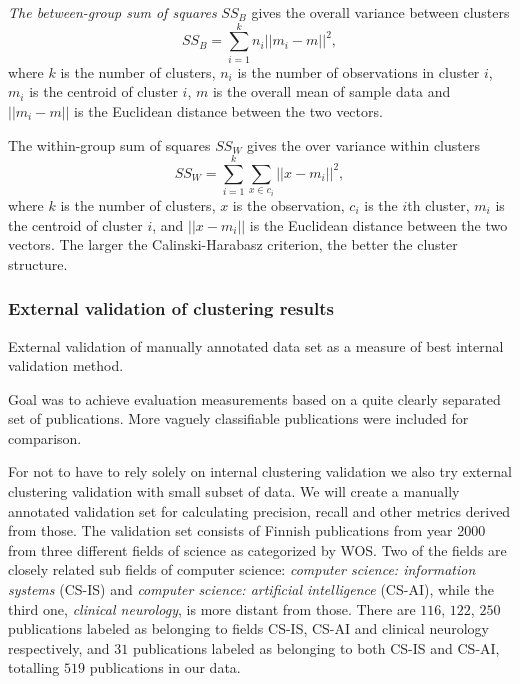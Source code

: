\emph{The between-group sum of squares} $SS_B$ gives the overall variance
between clusters
\begin{equation}
 SS_B = \sum_{i=1}^k n_i ||m_i-m||^2,
\end{equation}
where $k$ is the number of clusters, $n_i$ is the number of 
observations in cluster $i$, $m_i$ is the centroid of cluster $i$, 
$m$ is the overall mean of sample data and $||m_i-m||$ is the 
Euclidean distance between the two vectors.

The within-group sum of squares $SS_W$ gives the over variance 
within clusters
\begin{equation}
 SS_W = \sum_{i=1}^k \sum_{x\in c_i} ||x-m_i||^2,
\end{equation}
where $k$ is the number of clusters, $x$ is the observation, 
$c_i$ is the $i$th cluster, $m_i$ is the centroid of cluster $i$, and 
$||x-m_i||$ is the Euclidean distance between the two vectors.
The larger the Calinski-Harabasz criterion, the better the 
cluster structure.


\subsubsection{External validation of clustering results}
External validation of manually annotated data set as a measure of
best internal validation method.

Goal was to achieve evaluation measurements based on a quite 
clearly separated set of publications. More vaguely classifiable
publications were included for comparison.

For not to have to rely solely on internal clustering validation we
also try external clustering validation with small subset of data.
We will create a manually annotated validation set for calculating
precision, recall and other metrics derived from those.
The validation set consists of Finnish publications from year 2000
from three different fields of science as categorized by WOS.
Two of the fields are closely related sub fields of computer
science: \emph{computer science: information systems} (CS-IS) and 
\emph{computer science: 
artificial intelligence} (CS-AI), while the third one, 
\emph{clinical neurology}, is more distant from those. There are 
$116$, $122$, $250$ publications labeled as belonging to fields 
CS-IS, CS-AI and clinical neurology respectively, and $31$ 
publications labeled as belonging to both CS-IS and CS-AI, 
totalling $519$ publications in our data.

